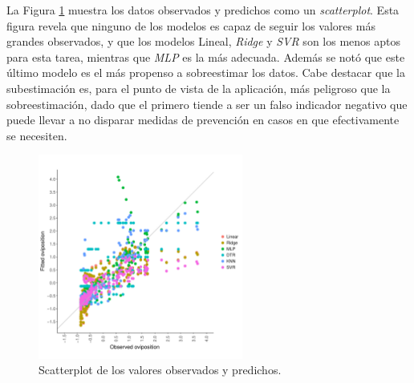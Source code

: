     \par La Figura \ref{fig:scatter} muestra los datos observados y predichos
      como un \textit{scatterplot}. Esta figura revela que ninguno de los modelos
      es capaz de seguir los valores más grandes observados, y que los modelos
      Lineal, \textit{Ridge} y \textit{SVR} son los menos aptos para esta
      tarea, mientras que \textit{MLP} es la más adecuada. Además se notó que
      este último modelo es el más propenso a sobreestimar los datos. Cabe
      destacar que la subestimación es, para el punto de vista de la aplicación,
      más peligroso que la sobreestimación, dado que el primero tiende a
      ser un falso indicador negativo que puede llevar a no disparar medidas
      de prevención en casos en que efectivamente se necesiten.
      \begin{figure}[hbt]
      \centering%
      \includegraphics[width=0.6\textwidth]{images/scatterplot}%
      \caption{Scatterplot de los valores observados y predichos.}\label{fig:scatter}
      \end{figure}



